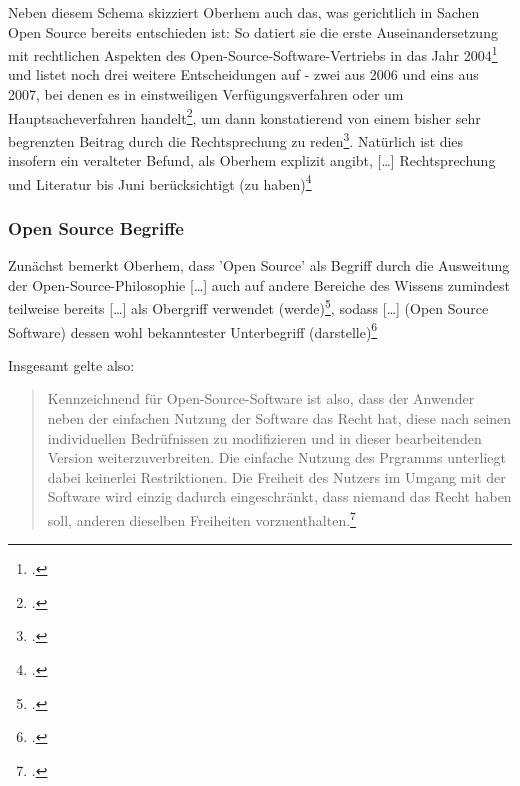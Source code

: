 \documentclass[DIV=calc,BCOR=5mm,11pt,headings=small,oneside,abstract=true, toc=bib]{scrartcl}
\begin{document}
Neben diesem Schema skizziert Oberhem auch das, was gerichtlich in Sachen Open
Source bereits entschieden ist: So datiert sie die erste
Auseinandersetzung mit \glqq{}rechtlichen Aspekten des
Open-Source-Software-Vertriebs\grqq{} in das Jahr
2004\footcite[vgl.][2]{Oberhem2008a} und listet noch drei weitere Entscheidungen
auf - zwei aus 2006 und eins aus 2007, bei denen es in
\glqq{}einstweiligen Verfügungsverfahren\grqq{} oder um
\glqq{}Hauptsacheverfahren\grqq{} handelt\footcite[vgl.][2f]{Oberhem2008a}, um
dann konstatierend von einem \glqq{}bisher sehr begrenzten Beitrag durch
die Rechtsprechung\grqq{} zu reden\footcite[vgl.][3]{Oberhem2008a}. Natürlich
ist dies insofern ein veralteter Befund, als Oberhem explizit angibt,
\glqq{}[\ldots] Rechtsprechung und Literatur bis Juni berücksichtigt (zu
haben)\grqq{}\footcite[vgl.][V = Vorwort]{Oberhem2008a}

\subsubsection{Open Source Begriffe}

Zunächst bemerkt Oberhem, dass 'Open Source' als Begriff durch die
\glqq{}Ausweitung\grqq{} der \glqq{}Open-Source-Philosophie [\ldots] auch auf
andere Bereiche des Wissens\grqq{} zumindest teilweise bereits \glqq{}[\ldots]
als Obergriff verwendet (werde)\grqq{}\footcite[vgl.][5]{Oberhem2008a}, sodass
\glqq{}[\ldots] (Open Source Software) dessen wohl bekanntester Unterbegriff
(darstelle)\grqq{}\footcite[vgl.][5f]{Oberhem2008a}

Insgesamt gelte also:

\begin{quote} \glqq{}Kennzeichnend für Open-Source-Software ist also,
dass der Anwender neben der einfachen Nutzung der Software das Recht hat,
diese nach seinen individuellen Bedrüfnissen zu modifizieren und in
dieser bearbeitenden Version weiterzuverbreiten. Die einfache Nutzung des
Prgramms unterliegt dabei keinerlei Restriktionen. Die Freiheit des
Nutzers im Umgang mit der Software wird einzig dadurch eingeschränkt, dass
niemand das Recht haben soll, anderen dieselben Freiheiten
vorzuenthalten.\grqq{}\footcite[vgl.][7]{Oberhem2008a}
\end{quote}
\end{document}

